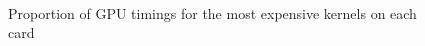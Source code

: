 \begin{figure}[!htc]
        \\ 
        \caption{ Proportion of GPU timings for the most expensive kernels on each card }
        \label{fig:pies}
\end{figure}

